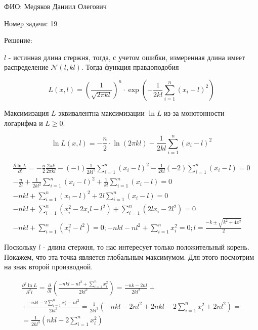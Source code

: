 \documentclass[14pt]{extarticle}
\begin{document}
ФИО: Медяков Даниил Олегович

\vspace{10pt}

Номер задачи: 19

\vspace{10pt}

Решение:

\vspace{10pt}

$l$ - истинная длина стержня, тогда, с учетом ошибки, измеренная длина имеет распределение $\mathcal{N}(l, kl)$. Тогда функция правдоподобия

\begin{equation*}
    L(x, l) = \left(\frac{1}{\sqrt{2\pi kl}}\right)^n\cdot \exp \left(-\frac{1}{2kl}\sum\limits_{i=1}^n (x_i - l)^2\right)
\end{equation*}

Максимизация $L$ эквивалентна максимизации $\ln L$ из-за монотонности логарифма и $L \geqslant 0$. 

\begin{equation*}
    \ln L(x, l) = -\frac{n}{2}\cdot\ln(2\pi kl)-\frac{1}{2kl}\sum\limits_{i=1}^n (x_i - l)^2
\end{equation*}

\begin{gather*}
    \frac{\partial \ln L}{\partial l} = -\frac{n}{2}\frac{2\pi k}{2\pi kl} - (-1)\frac{1}{2kl^2}\sum\limits_{i=1}^n (x_i - l)^2 - \frac{1}{2kl}(-2)\sum\limits_{i=1}^n (x_i - l) = 0\\
    -\frac{n}{2l}+\frac{1}{2kl^2}\sum\limits_{i=1}^n (x_i - l)^2 + \frac{1}{kl}\sum\limits_{i=1}^n (x_i - l) = 0\\
    -nkl + \sum\limits_{i=1}^n (x_i - l)^2 + 2l\sum\limits_{i=1}^n (x_i - l) = 0\\
    -nkl + \sum\limits_{i=1}^n (x_i^2 - 2x_i l - l^2) + \sum\limits_{i=1}^n (2lx_i - 2l^2) = 0\\
    -nkl + \sum\limits_{i=1}^n (x_i^2 - l^2) = 0; -nkl - nl^2 + \sum\limits_{i=1}^n x_i^2 = 0; l = \frac{-k \pm \sqrt{k^2 + 4\overline{x^2}}}{2}
\end{gather*}

Поскольку $l$ - длина стержня, то нас интересует только положительный корень. Покажем, что эта точка является глобальным максимумом. Для этого посмотрим на знак второй производной.

\begin{gather*}
    \frac{\partial^2 \ln L}{\partial^2 l} = \frac{\partial}{\partial l}\left(\frac{-nkl - nl^2 + \sum\limits_{i=1}^n x_i^2}{2kl^2}\right) = \frac{-nk - 2nl}{2kl^2} +\\
    + \frac{-nkl - 2 \sum\limits_{i=1}^n x_i^2 - nl^2}{2kl^3} = \frac{1}{2kl^3}\left(-nkl - 2nl^2 + 2nkl - 2\sum\limits_{i=1}^n x_i^2 + 2nl^2\right) =\\
    =\frac{1}{2kl^3}\left(nkl - 2\sum\limits_{i=1}^n x_i^2\right)
\end{gather*}
\end{document}
